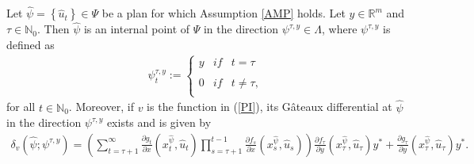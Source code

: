 \documentclass[10pt,a4paper]{amsart}
\newcommand{\nat}{\mathbb N_0}
\newcommand{\rzm}{\mathbb R^{m}}
\begin{document}
	\begin{lem}\label{DV}
		Let  $\hat \psi=\left\lbrace \hat u_t\right\rbrace \in \Psi$ be a plan for which Assumption \ref{AMP} holds. Let $y\in\rzm$ and $\tau\in\nat$. Then $\hat\psi$ is an internal point of $\Psi$ in the direction $\psi^{\tau,y}\in\Lambda$, where $\psi^{\tau,y}$ is defined as 
		\begin{align*}
		\psi^{\tau,y}_t:=\left\{ \begin{array}{lcc}
		\displaystyle y &   if  & t=\tau \\
		\\ 0 &  if & t\neq\tau, \\
		\end{array}
		\right.
		\end{align*}
		for all $t\in\nat$. Moreover, if $v$ is the function in (\ref{PI}), its G\^ ateaux differential at $\hat\psi$ in the direction $\psi^{\tau,y}$ exists and is given by 
		\begin{align*}
		\delta_v(\hat\psi;\psi^{\tau,y})= \left( \sum_{t=\tau+1}^\infty\frac{\partial g_t}{\partial x}(x_t^{\hat{\psi}},\hat u_t)\prod_{s=\tau+1}^{t-1}\frac{\partial f_s}{\partial x}(x_s^{\hat{\psi}},\hat u_s)\right)\frac{\partial f_\tau}{\partial y}(x_\tau^{\hat{\psi}},\hat u_\tau)y^*+\frac{\partial g_\tau}{\partial y}(x_\tau^{\hat{\psi}},\hat u_\tau)y^*.
		\end{align*} 
	\end{lem} 
\end{document}
